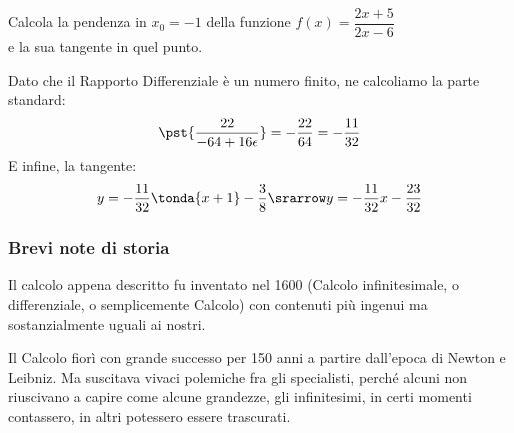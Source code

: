 \begin{esempio}
Calcola la pendenza in \(x_0 = -1\) della funzione 
\(f(x)=\dfrac{2x +5}{2x -6}\) \\
e la sua tangente in quel punto.

Dato che il Rapporto Differenziale è un numero finito, ne calcoliamo la 
parte standard:
\[\pst{\dfrac{22}{-64 +16 \epsilon}} = -\dfrac{22}{64} = -\dfrac{11}{32}\]
E infine, la tangente:
\[y = -\dfrac{11}{32} \tonda{x +1} - \dfrac{3}{8} \srarrow 
  y = -\dfrac{11}{32} x -\dfrac{23}{32}\]
\end{esempio}

\subsubsection{Brevi note di storia}
Il calcolo appena descritto fu inventato nel 1600 (Calcolo infinitesimale, o 
differenziale, o semplicemente Calcolo) con contenuti più ingenui ma 
sostanzialmente uguali ai nostri. 


Il Calcolo fiorì con grande successo per 150 anni a partire 
dall'epoca di Newton e Leibniz. 
Ma suscitava vivaci polemiche fra gli specialisti, perché 
alcuni non riuscivano a capire come alcune grandezze, gli infinitesimi, 
in certi momenti contassero, in altri potessero essere trascurati.

